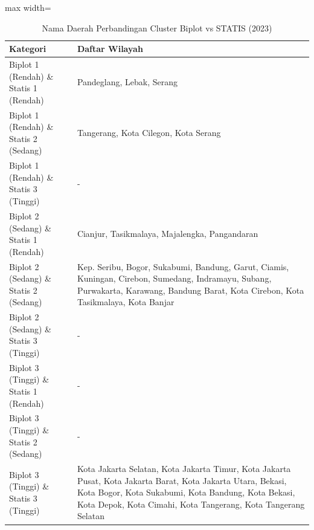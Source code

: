 \begin{table}[H]
\centering
\caption{Nama Daerah Perbandingan Cluster Biplot vs STATIS (2023)} \label{tab:appbiplot_statis_comp_name_2023}
\begin{adjustbox}{max width=\textwidth}
\begin{tabular}{|p{4cm}|p{10cm}|}
\hline
\textbf{Kategori} & \textbf{Daftar Wilayah} \\
\hline
Biplot 1 (Rendah) \& Statis 1 (Rendah) & Pandeglang, Lebak, Serang \\
\hline
Biplot 1 (Rendah) \& Statis 2 (Sedang) & Tangerang, Kota Cilegon, Kota Serang \\
\hline
Biplot 1 (Rendah) \& Statis 3 (Tinggi) & - \\
\hline
Biplot 2 (Sedang) \& Statis 1 (Rendah) & Cianjur, Tasikmalaya, Majalengka, Pangandaran \\
\hline
Biplot 2 (Sedang) \& Statis 2 (Sedang) & Kep. Seribu, Bogor, Sukabumi, Bandung, Garut, Ciamis, Kuningan, Cirebon, Sumedang, Indramayu, Subang, Purwakarta, Karawang, Bandung Barat, Kota Cirebon, Kota Tasikmalaya, Kota Banjar \\
\hline
Biplot 2 (Sedang) \& Statis 3 (Tinggi) & - \\
\hline
Biplot 3 (Tinggi) \& Statis 1 (Rendah) & - \\
\hline
Biplot 3 (Tinggi) \& Statis 2 (Sedang) & - \\
\hline
Biplot 3 (Tinggi) \& Statis 3 (Tinggi) & Kota Jakarta Selatan, Kota Jakarta Timur, Kota Jakarta Pusat, Kota Jakarta Barat, Kota Jakarta Utara, Bekasi, Kota Bogor, Kota Sukabumi, Kota Bandung, Kota Bekasi, Kota Depok, Kota Cimahi, Kota Tangerang, Kota Tangerang Selatan \\
\hline
\end{tabular}
\end{adjustbox}
\end{table}